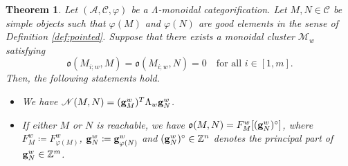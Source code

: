 \documentclass[12pt]{amsart}
\newtheorem{theorem}{Theorem}[section]
\theoremstyle{definition}
\theoremstyle{remark}
\numberwithin{equation}{section}
\begin{document}
\begin{theorem} 
\label{thm:F-o} Let $(\mathcal{A}, \mathcal{C}, \varphi)$ be a $\mathsf{\Lambda}$-monoidal categorification.
Let $M, N\in\mathcal C$ be simple objects such that $\varphi(M)$ and $\varphi(N)$ are good elements in the sense of Definition \ref{def:pointed}. 
Suppose that there exists a monoidal cluster $\mathcal M_w$ satisfying 
\begin{equation}\label{eq:assump-o=0}
\mathfrak{o}(M_{i;w}, M) =\mathfrak{o}(M_{i;w}, N)=0 \quad \text{for all $i\in[1,m]$}. 
\end{equation}
Then, the following statements hold.
\begin{itemize}
    \item [(i)] We have $
\mathscr{N}(M,N) = ({\bf g}^{w}_M)^T \Lambda_{w} {\bf g}^{w}_N$.
\item[(ii)] If either $M$ or $N$ is reachable, we have $\mathfrak{o}(M,N) = F_{M}^{w}[({\bf g}^{w}_N)^\circ]$, where $F_M^w\coloneqq F_{\varphi(M)}^w$, ${\bf g}^{w}_N\coloneqq {\bf g}_{\varphi(N)}^w$ and  $({\bf g}^{w}_N)^\circ\in\mathbb Z^n$ denotes the principal part of ${\bf g}^{w}_N\in\mathbb Z^m$.
\end{itemize} 
\end{theorem}
\end{document}
